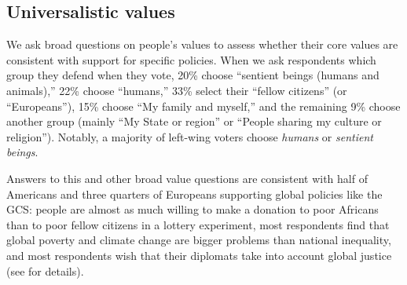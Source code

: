 \subsection{Universalistic values}\label{subsec:universalistic}

We ask broad questions on people's values to assess whether their core values are consistent with support for specific policies. 
When we ask respondents which group they defend when they vote, %
20\% choose ``sentient beings (humans and animals),'' 22\% choose ``humans,'' 33\% select their ``fellow citizens'' (or ``Europeans''), 15\% choose ``My family and myself,'' and the remaining 9\% choose another group (mainly ``My State or region'' or ``People sharing my culture or religion''). 
Notably, a majority of left-wing voters choose \textit{humans} or \textit{sentient beings}. 

Answers to this and other broad value questions are consistent with half of Americans and three quarters of Europeans supporting global policies like the GCS: people are almost as much willing to make a donation to poor Africans than to poor fellow citizens in a lottery experiment, most respondents find that global poverty and climate change are bigger problems than national inequality, and most respondents wish that their diplomats take into account global justice (see  for details).


